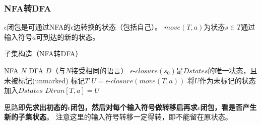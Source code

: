 \subsubsection{NFA转DFA}
\begin{definition}
$\epsilon$闭包是可通过NFA的$\epsilon$边转换的状态（包括自己）。
$move(T,a)$为状态$s\in T$通过输入符号$a$可到达的新的状态。
\end{definition}
\begin{algorithm}[H]
\centering
\caption{子集构造（NFA转DFA）}
\begin{algorithmic}[1]
\Require NFA $N$
\Ensure DFA $D$（与$N$接受相同的语言）
\State $\epsilon$-$closure(s_0)$是$Dstates$的唯一状态，且未被标记(unmarked)
\State 标记$T$
\State $U=\epsilon$-$closure(move(T,a))$
\State 将$U$作为未标记的状态加入$Dstates$
\EndIf
\State $Dtran[T,a]=U$
\EndFor
\EndWhile
\end{algorithmic}
\end{algorithm}

思路即\textbf{先求出初态的$\epsilon$闭包，然后对每个输入符号做转移后再求$\epsilon$闭包，看是否产生新的子集状态}。
注意这里的输入符号转移一定得转，即不能留在原状态。

